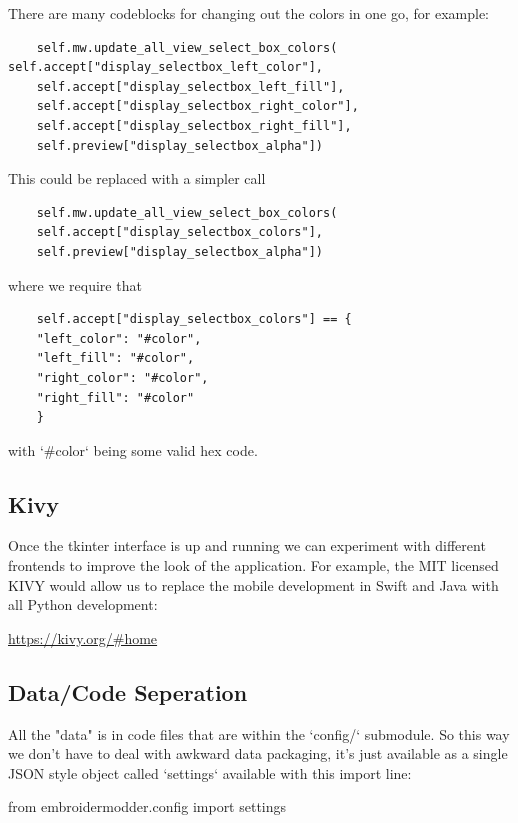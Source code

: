 \documentclass[11pt]{report}
\begin{document}
There are many codeblocks for changing out the colors in one go, for example:

\begin{lstlisting}
    self.mw.update_all_view_select_box_colors(    self.accept["display_selectbox_left_color"],
    self.accept["display_selectbox_left_fill"],
    self.accept["display_selectbox_right_color"],
    self.accept["display_selectbox_right_fill"],
    self.preview["display_selectbox_alpha"])
\end{lstlisting}

This could be replaced with a simpler call

\begin{lstlisting}
    self.mw.update_all_view_select_box_colors(
    self.accept["display_selectbox_colors"],
    self.preview["display_selectbox_alpha"])
\end{lstlisting}

where we require that

\begin{lstlisting}
    self.accept["display_selectbox_colors"] == {
    "left_color": "#color",
    "left_fill": "#color",
    "right_color": "#color",
    "right_fill": "#color"
    }
\end{lstlisting}

with `\#color` being some valid hex code.

\subsection{Kivy}

Once the tkinter interface is up and running we can experiment
with different frontends to improve the look of the application.
For example, the MIT licensed KIVY would allow us to replace the 
mobile development in Swift and Java with all Python development:

\url{https://kivy.org/#home}

\subsection{Data/Code Seperation}

All the "data" is in code files that are within the `config/`
submodule. So this way we don't have to deal with awkward data
packaging, it's just available as a single JSON style object
called `settings` available with this import line:

    from embroidermodder.config import settings
\end{document}
